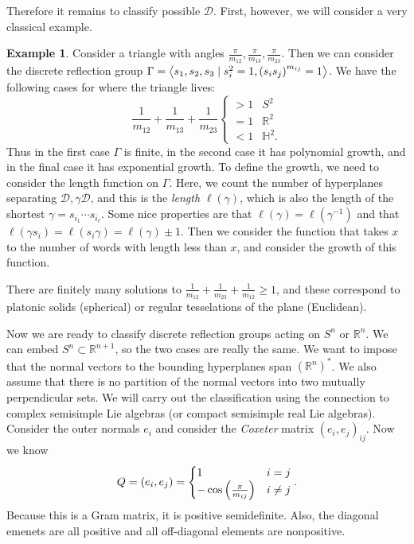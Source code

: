 \documentclass[leqno, openany]{memoir}
\theoremstyle{definition}
\newtheorem{exm}[thm]{Example}
\theoremstyle{remark}
\theoremstyle{plain}
\theoremstyle{definition}
\theoremstyle{remark}
\newcommand{\R}{\mathbb{R}}
\renewcommand{\H}{\mathbb{H}}
\newcommand{\mc}[1]{\mathcal{#1}}
\begin{document}
Therefore it remains to classify possible $\mc{D}$. First, however, we will consider a very classical example.

\begin{exm}
    Consider a triangle with angles $\frac{\pi}{m_{12}}, \frac{\pi}{m_{13}}, \frac{\pi}{m_{23}}$. 
    Then we can consider the discrete reflection group $\Gamma = \ev{s_1, s_2, s_3 \mid s_i^2 = 1, {(s_i s_j)}^{m_{ij}} = 1}$. We have the following cases for where the triangle lives:
    \[ \frac{1}{m_{12}} + \frac{1}{m_{13}} + \frac{1}{m_{23}} \begin{cases}
        > 1 & S^2 \\
        = 1 & \R^2 \\
        < 1 & \H^2.
    \end{cases} \]
    Thus in the first case $\Gamma$ is finite, in the second case it has polynomial growth, and in the final case it has exponential growth. To define the growth, we need to consider the length function on $\Gamma$. Here, we count the number of hyperplanes separating $\mc{D}, \gamma \mc{D}$, and this is the \textit{length} $\ell(\gamma)$, which is also the length of the shortest $\gamma = s_{i_1} \cdots s_{i_{\ell}}$. Some nice properties are that $\ell(\gamma) = \ell(\gamma^{-1})$ and that $\ell(\gamma s_i) = \ell(s_i \gamma) = \ell(\gamma) \pm 1$. Then we consider the function that takes $x$ to the number of words with length less than $x$, and consider the growth of this function.

    There are finitely many solutions to $\frac{1}{m_{12}} + \frac{1}{m_{23}} + \frac{1}{m_{12}} \geq 1$, and these correspond to platonic solids (spherical) or regular tesselations of the plane (Euclidean).
\end{exm}

Now we are ready to classify discrete reflection groups acting on $S^n$ or $\R^n$. We can embed $S^n \subset \R^{n+1}$, so the two cases are really the same. We want to impose that the normal vectors to the bounding hyperplanes span ${(\R^n)}^*$. We also assume that there is no partition of the normal vectors into two mutually perpendicular sets. We will carry out the classification using the connection to complex semisimple Lie algebras (or compact semisimple real Lie algebras). Consider the outer normals $e_i$ and consider the \textit{Coxeter} matrix ${(e_i, e_j)}_{ij}$. Now we know 
\[ Q = (e_i, e_j) = \begin{cases}
    1 & i = j \\
    - \cos \qty(\frac{\pi}{m_{ij}}) & i \neq j
\end{cases}. \]
Because this is a Gram matrix, it is positive semidefinite. Also, the diagonal emenets are all positive and all off-diagonal elements are nonpositive. 
\end{document}
